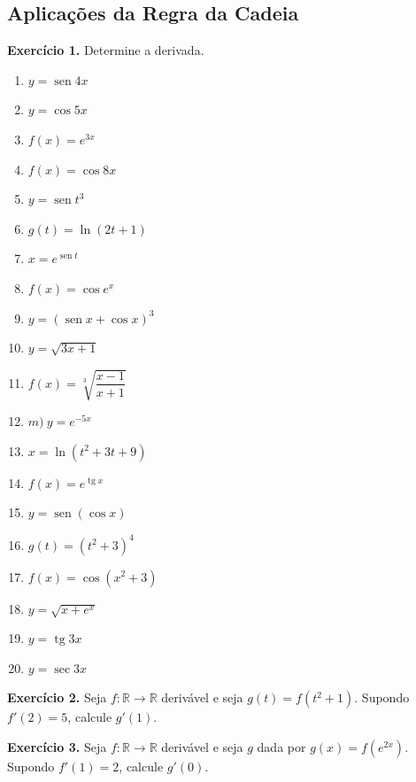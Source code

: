 \documentclass[12pt,a4paper]{article}
\begin{document}
\subsection{Aplicações da Regra da Cadeia}
\vspace{0.5cm}
\noindent\textbf{Exercício 1.} Determine a derivada.
\begin{enumerate}
    \renewcommand{\theenumi}{\alph{enumi}}
    \renewcommand{\labelenumi}{\theenumi)}
    \item $y = \operatorname{sen} 4x$
    \item $y = \cos 5x$
    \item $f(x) = e^{3x}$
    \item $f(x) = \cos 8x$
    \item $y = \operatorname{sen} t^3$
    \item $g(t) = \ln(2t + 1)$
    \item $x = e^{\operatorname{sen} t}$
    \item $f(x) = \cos e^x$
    \item $y = (\operatorname{sen} x + \cos x)^3$
    \item $y = \sqrt{3x + 1}$
    \item $f(x) = \sqrt[3]{\dfrac{x - 1}{x + 1}}$
    \item $m) \ y = e^{-5x}$
    \item $x = \ln(t^2 + 3t + 9)$
    \item $f(x) = e^{\operatorname{tg} x}$
    \item $y = \operatorname{sen}(\cos x)$
    \item $g(t) = (t^2 + 3)^4$
    \item $f(x) = \cos(x^2 + 3)$
    \item $y = \sqrt{x + e^x}$
    \item $y = \operatorname{tg} 3x$
    \item $y = \sec 3x$
\end{enumerate}

\vspace{0.5cm}
\noindent\textbf{Exercício 2.}
Seja $f\colon \mathbb{R} \to \mathbb{R}$ derivável e seja $g(t) = f(t^2 + 1)$. Supondo $f'(2) = 5$, calcule $g'(1)$.

\vspace{0.5cm}
\noindent\textbf{Exercício 3.}
Seja $f\colon \mathbb{R} \to \mathbb{R}$ derivável e seja $g$ dada por $g(x) = f(e^{2x})$. Supondo $f'(1) = 2$, calcule $g'(0)$.
\end{document}
